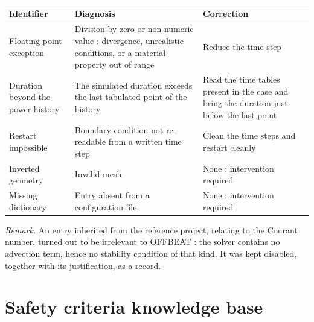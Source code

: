 \documentclass[12pt,a4paper]{report}
\begin{document}
\vspace{0.3cm}
\noindent
\begin{tabularx}{\textwidth}{@{}>{\raggedright\arraybackslash}p{3.4cm}XX@{}}
\toprule
\textbf{Identifier} & \textbf{Diagnosis} & \textbf{Correction}\\
\midrule
Floating-point exception & Division by zero or non-numeric value : divergence,
  unrealistic conditions, or a material property out of range
  & Reduce the time step\\
Duration beyond the power history & The simulated duration exceeds the last
  tabulated point of the history & Read the time tables present in the case and
  bring the duration just below the last point\\
Restart impossible & Boundary condition not re-readable from a written time
  step & Clean the time steps and restart cleanly\\
Inverted geometry & Invalid mesh & None : intervention required\\
Missing dictionary & Entry absent from a configuration file &
  None : intervention required\\
\bottomrule
\end{tabularx}

\vspace{0.4cm}
\noindent\textit{Remark.} An entry inherited from the reference project,
relating to the Courant number, turned out to be irrelevant to OFFBEAT : the
solver contains no advection term, hence no stability condition of that kind. It
was kept disabled, together with its justification, as a record.

\section{Safety criteria knowledge base}
\label{ann:safetykb}
\end{document}
